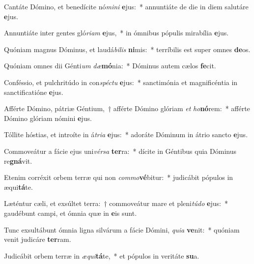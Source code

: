 \item Cantáte Dómino, et benedícite nó\textit{mi}\textit{ni} \textbf{e}jus:~* annuntiáte de die in diem salutáre \textbf{e}jus.
\item Annuntiáte inter gentes gló\textit{ri}\textit{am} \textbf{e}jus,~* in ómnibus pópulis mirabília \textbf{e}jus.
\item Quóniam magnus Dóminus, et laudá\textit{bi}\textit{lis} \textbf{ni}mis:~* terríbilis est super omnes \textbf{de}os.
\item Quóniam omnes dii Génti\textit{um} \textit{dæ}\textbf{mó}nia:~* Dóminus autem cælos \textbf{fe}cit.
\item Conféssio, et pulchritúdo in con\textit{spéc}\textit{tu} \textbf{e}jus:~* sanctimónia et magnificéntia in sanctificatióne \textbf{e}jus.
\item Afférte Dómino, pátriæ Géntium,~† afférte Dómino glóriam \textit{et} \textit{ho}\textbf{nó}rem:~* afférte Dómino glóriam nómini \textbf{e}jus.
\item Tóllite hóstias, et introíte in á\textit{tri}\textit{a} \textbf{e}jus:~* adoráte Dóminum in átrio sancto \textbf{e}jus.
\item Commoveátur a fácie ejus uni\textit{vér}\textit{sa} \textbf{ter}ra:~* dícite in Géntibus quia Dóminus re\textbf{gná}vit.
\item Etenim corréxit orbem terræ qui non \textit{com}\textit{mo}\textbf{vé}bitur:~* judicábit pópulos in æqui\textbf{tá}te.
\item Læténtur cæli, et exsúltet terra:~† commoveátur mare et pleni\textit{tú}\textit{do} \textbf{e}jus:~* gaudébunt campi, et ómnia quæ in \textbf{e}is sunt.
\item Tunc exsultábunt ómnia ligna silvárum a fácie Dómini, \textit{qui}\textit{a} \textbf{ve}nit:~* quóniam venit judicáre \textbf{ter}ram.
\item Judicábit orbem terræ in \textit{æ}\textit{qui}\textbf{tá}te,~* et pópulos in veritáte \textbf{su}a.
